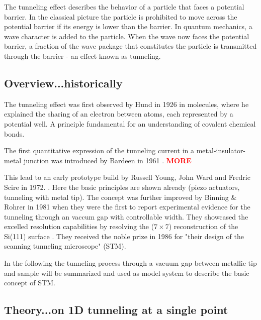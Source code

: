 The tunneling effect describes the behavior of a particle that faces a potential barrier. In the classical picture the particle is prohibited to move across the potential barrier if its energy is lower than the barrier. In quantum mechanics, a wave character is added to the particle. When the wave now faces the potential barrier, a fraction of the wave package that constitutes the particle is transmitted through the barrier - an effect known as tunneling.

\subsection{Overview...historically}
The tunneling effect was first observed by Hund in 1926 in molecules, where he explained the sharing of an electron between atoms, each represented by a potential well.\cite{Mehra_tunneling_1982} A principle fundamental for an understanding of covalent chemical bonds. 

The first quantitative expression of the tunneling current in a metal-insulator-metal junction was introduced by Bardeen in 1961 \cite{Bardeen_tunneling_1961}. \textcolor{red}{\textbf{MORE}}

This lead to an early prototype build by Russell Young, John Ward and Fredric Scire in 1972. \cite{Young_topographiner_1972}. Here the basic principles are shown already (piezo actuators, tunneling with metal tip). The concept was further improved by Binning \& Rohrer in 1981 \cite{binning_tunneling_1982} when they were the first to report experimental evidence for the tunneling through an vaccum gap with controllable width. They showcased the excelled resolution capabilities by resolving the ($7 \times 7$) reconstruction of the Si(111) surface \cite{binnig_1983}. They received the noble prize in 1986 \cite{_noble_price_1986} for "their design of the scanning tunneling microscope" (STM). 

In the following the tunneling process through a vacuum gap between metallic tip and sample will be summarized and used as model system to describe the basic concept of STM.

\subsection{Theory...on 1D tunneling at a single point}

